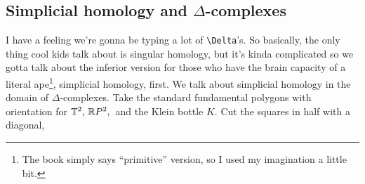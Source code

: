\subsection{Simplicial homology and $\Delta$-complexes}
I have a feeling we're gonna be typing a lot of \texttt{\textbackslash Delta}'s. So basically, the only thing cool kids talk about is singular homology, but it's kinda complicated so we gotta talk about the inferior version for those who have the brain capacity of a literal ape\footnote{The book simply says ``primitive'' version, so I used my imagination a little bit.}, simplicial homology, first. We talk about simplicial homology in the domain of $\Delta $-complexes. Take the standard fundamental polygons with orientation for $\mathbb{T}^2,\,\mathbb{R} P^2,\,$ and the Klein bottle $K$. Cut the squares in half with a diagonal,
